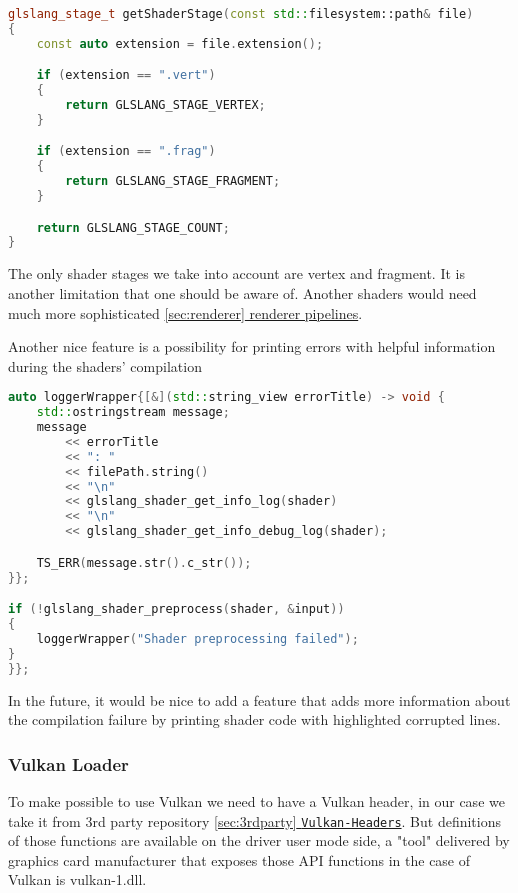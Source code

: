 \begin{lstlisting}[language=c++, caption=Shader Compiler supported shader stages (./engine/src/vulkan\_tools/shaders\_compiler.cpp)]
glslang_stage_t getShaderStage(const std::filesystem::path& file)
{
    const auto extension = file.extension();

    if (extension == ".vert")
    {
        return GLSLANG_STAGE_VERTEX;
    }

    if (extension == ".frag")
    {
        return GLSLANG_STAGE_FRAGMENT;
    }

    return GLSLANG_STAGE_COUNT;
}
\end{lstlisting}

The only shader stages we take into account are vertex and fragment. It is another limitation that one should be aware of. Another shaders would need much more sophisticated \hyperref[sec:renderer]{\ref*{sec:renderer} renderer pipelines}.

Another nice feature is a possibility for printing errors with helpful information during the shaders' compilation
\begin{lstlisting}[language=c++, caption=Shader Compiler logging (./engine/src/vulkan\_tools/shaders\_compiler.cpp)]
auto loggerWrapper{[&](std::string_view errorTitle) -> void {
    std::ostringstream message;
    message
        << errorTitle
        << ": "
        << filePath.string()
        << "\n"
        << glslang_shader_get_info_log(shader)
        << "\n"
        << glslang_shader_get_info_debug_log(shader);

    TS_ERR(message.str().c_str());
}};

if (!glslang_shader_preprocess(shader, &input))
{
    loggerWrapper("Shader preprocessing failed");
}
}};
\end{lstlisting}

In the future, it would be nice to add a feature that adds more information about the compilation failure by printing shader code with highlighted corrupted lines. 

\newpage
\subsubsection{Vulkan Loader}
\label{sec:vkLoader}
\hspace{\parindent}
To make possible to use Vulkan we need to have a Vulkan header, in our case we take it from 3rd party repository  \hyperref[sec:3rdparty]{\ref*{sec:3rdparty} \texttt{Vulkan-Headers}}. But definitions of those functions are available on the driver user mode side, a "tool" delivered by graphics card manufacturer that exposes those API functions in the case of Vulkan is vulkan-1.dll.

